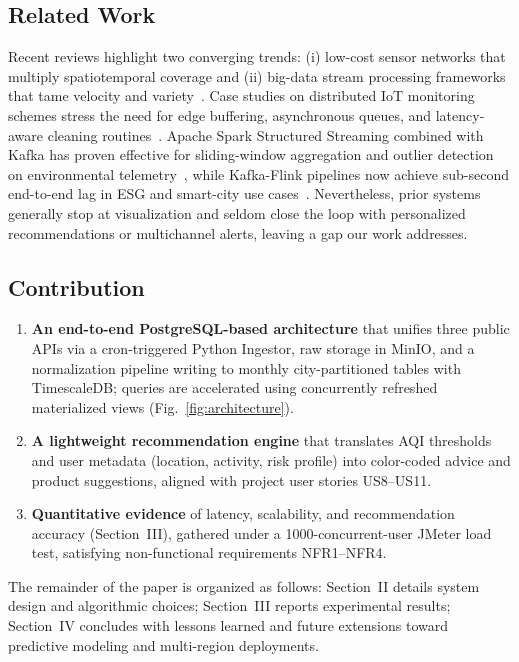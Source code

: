 \subsection{Related Work}

Recent reviews highlight two converging trends: (i) low-cost sensor networks that multiply spatiotemporal coverage and (ii) big-data stream processing frameworks that tame velocity and variety~\cite{wiley}. Case studies on distributed IoT monitoring schemes stress the need for edge buffering, asynchronous queues, and latency-aware cleaning routines~\cite{mdpi}. Apache Spark Structured Streaming combined with Kafka has proven effective for sliding-window aggregation and outlier detection on environmental telemetry~\cite{medium}, while Kafka-Flink pipelines now achieve sub-second end-to-end lag in ESG and smart-city use cases~\cite{esr}. Nevertheless, prior systems generally stop at visualization and seldom close the loop with personalized recommendations or multichannel alerts, leaving a gap our work addresses.

\subsection{Contribution}

\begin{enumerate}
    \item \textbf{An end-to-end PostgreSQL-based architecture} that unifies three public APIs via a cron-triggered Python Ingestor, raw storage in MinIO, and a normalization pipeline writing to monthly city-partitioned tables with TimescaleDB; queries are accelerated using concurrently refreshed materialized views (Fig.~\ref{fig:architecture}).
    \item \textbf{A lightweight recommendation engine} that translates AQI thresholds and user metadata (location, activity, risk profile) into color-coded advice and product suggestions, aligned with project user stories US8–US11.
    \item \textbf{Quantitative evidence} of latency, scalability, and recommendation accuracy (Section~III), gathered under a 1000-concurrent-user JMeter load test, satisfying non-functional requirements NFR1–NFR4.
\end{enumerate}


The remainder of the paper is organized as follows: Section~II details system design and algorithmic choices; Section~III reports experimental results; Section~IV concludes with lessons learned and future extensions toward predictive modeling and multi-region deployments.
